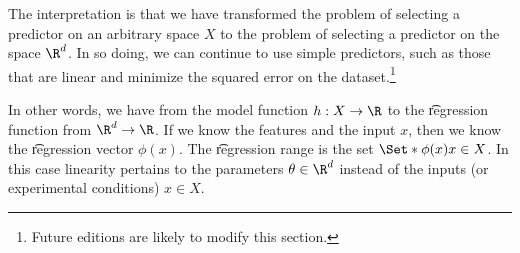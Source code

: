 The interpretation is that we have transformed the problem of selecting a predictor on an arbitrary space $X$ to the problem of selecting a predictor on the space $\R^d$.
In so doing, we can continue to use simple predictors, such as those that are linear and minimize the squared error on the dataset.\footnote{Future editions are likely to modify this section.}

In other words, we have  from the model function $h: X \to \R$ to the \t{regression function} from $\R^d \to \R$.
If we know the features and the input $x$, then we know the \t{regression vector} $\phi(x)$.
The \t{regression range} is the set $\Set*{\phi(x)}{x \in X}$.
In this case linearity pertains to the parameters $\theta \in \R^d$ instead of the inputs (or experimental conditions) $x \in X$.
